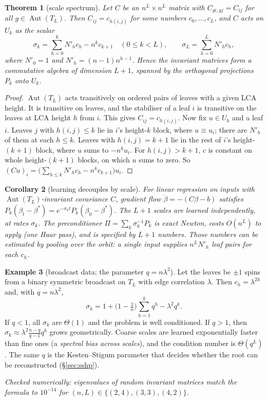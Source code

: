 \documentclass[11pt]{article}
\newtheorem{theorem}{Theorem}[section]
\newtheorem{corollary}[theorem]{Corollary}
\theoremstyle{definition}
\newtheorem{example}[theorem]{Example}
\newcommand{\Aut}{\operatorname{Aut}}
\begin{document}
\begin{theorem}[scale spectrum]\label{thm:spec}
Let $C$ be an $n^L\times n^L$ matrix with $C_{g i,g j}=C_{ij}$ for all $g\in\Aut(T_L)$.
Then $C_{ij}=c_{h(i,j)}$ for some numbers $c_0,\dots,c_L$, and $C$ acts on $U_k$ as the scalar
\[
\sigma_k=\sum_{h=0}^{k}N'_h c_h-n^k c_{k+1}\quad(0\le k<L),\qquad
\sigma_L=\sum_{h=0}^{L}N'_h c_h,
\]
where $N'_0=1$ and $N'_h=(n-1)n^{h-1}$. Hence the invariant matrices form a commutative algebra
of dimension $L+1$, spanned by the orthogonal projections $P_k$ onto $U_k$.
\end{theorem}
\begin{proof}
$\Aut(T_L)$ acts transitively on ordered pairs of leaves with a given LCA height. It is
transitive on leaves, and the stabiliser of a leaf $i$ is transitive on the leaves at LCA height
$h$ from $i$. This gives $C_{ij}=c_{h(i,j)}$. Now fix $u\in U_k$ and a leaf $i$.
Leaves $j$ with $h(i,j)\le k$ lie in $i$'s height-$k$ block, where $u\equiv u_i$; there are
$N'_h$ of them at each $h\le k$. Leaves with $h(i,j)=k+1$ lie in the rest of $i$'s
height-$(k{+}1)$ block, where $u$ sums to $-n^ku_i$. For $h(i,j)>k+1$, $c$ is constant on whole
height-$(k{+}1)$ blocks, on which $u$ sums to zero. So
$(Cu)_i=\big(\sum_{h\le k}N'_hc_h-n^kc_{k+1}\big)u_i$.
\end{proof}

\begin{corollary}[learning decouples by scale]\label{cor:gd}
For linear regression on inputs with $\Aut(T_L)$-invariant covariance $C$, gradient flow
$\dot\beta=-(C\beta-b)$ satisfies $P_k(\beta_t-\beta^*)=e^{-\sigma_k t}P_k(\beta_0-\beta^*)$.
The $L{+}1$ scales are learned independently, at rates $\sigma_k$. The preconditioner
$\Pi=\sum_k\sigma_k^{-1}P_k$ is exact Newton, costs $O(n^L)$ to apply (one Haar pass), and is
specified by $L{+}1$ numbers. Those numbers can be estimated by pooling over the orbit: a single
input supplies $n^L N'_h$ leaf pairs for each $c_h$.
\end{corollary}

\begin{example}[broadcast data; the parameter $q=n\lambda^2$]\label{ex:bsc}
Let the leaves be $\pm1$ spins from a binary symmetric broadcast on $T_L$ with edge
correlation $\lambda$. Then $c_h=\lambda^{2h}$ and, with $q=n\lambda^2$,
\[
\sigma_k=1+\big(1-\tfrac1n\big)\sum_{h=1}^{k}q^h-\lambda^2q^k .
\]
If $q<1$, all $\sigma_k$ are $\Theta(1)$ and the problem is well conditioned. If $q>1$, then
$\sigma_k\approx\lambda^2\frac{n-q}{q-1}q^k$ grows geometrically. Coarse scales are learned
exponentially faster than fine ones (a \emph{spectral bias across scales}), and the condition
number is $\Theta(q^L)$. The same $q$ is the Kesten--Stigum parameter that decides whether the
root can be reconstructed (\S\ref{sec:sshp}).
\end{example}
\noindent\emph{Checked numerically: eigenvalues of random invariant matrices match the formula to
$10^{-14}$ for $(n,L)\in\{(2,4),(3,3),(4,2)\}$.}
\end{document}
